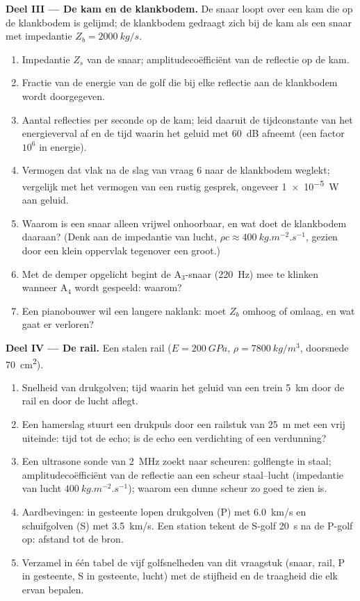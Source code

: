 \begin{problem}
\medskip
\noindent\textbf{Deel III --- De kam en de klankbodem.}
De snaar loopt over een kam die op de klankbodem is gelijmd; de klankbodem
gedraagt zich bij de kam als een snaar met impedantie
$Z_b = \qty{2000}{kg/s}$.
\begin{enumerate}[resume]
  \item Impedantie $Z_s$ van de snaar; amplitudecoëfficiënt van de reflectie
        op de kam.
  \item Fractie van de energie van de golf die bij elke reflectie aan de
        klankbodem wordt doorgegeven.
  \item Aantal reflecties per seconde op de kam; leid daaruit de
        tijdconstante van het energieverval af en de tijd waarin het geluid
        met \qty{60}{dB} afneemt (een factor $10^6$ in energie).
  \item Vermogen dat vlak na de slag van vraag 6 naar de klankbodem weglekt;
        vergelijk met het vermogen van een rustig gesprek, ongeveer
        \qty{1e-5}{W} aan geluid.
  \item Waarom is een snaar alleen vrijwel onhoorbaar, en wat doet de
        klankbodem daaraan? (Denk aan de impedantie van lucht,
        $\rho c \approx \qty{400}{kg.m^{-2}.s^{-1}}$, gezien door een klein
        oppervlak tegenover een groot.)
  \item Met de demper opgelicht begint de A$_3$-snaar (\qty{220}{Hz}) mee te
        klinken wanneer A$_4$ wordt gespeeld: waarom?
  \item Een pianobouwer wil een langere naklank: moet $Z_b$ omhoog of
        omlaag, en wat gaat er verloren?
\end{enumerate}

\medskip
\noindent\textbf{Deel IV --- De rail.}
Een stalen rail ($E = \qty{200}{GPa}$, $\rho = \qty{7800}{kg/m^3}$,
doorsnede \qty{70}{cm^2}).
\begin{enumerate}[resume]
  \item Snelheid van drukgolven; tijd waarin het geluid van een trein
        \qty{5}{km} door de rail en door de lucht aflegt.
  \item Een hamerslag stuurt een drukpuls door een railstuk van \qty{25}{m}
        met een vrij uiteinde: tijd tot de echo; is de echo een verdichting
        of een verdunning?
  \item Een ultrasone sonde van \qty{2}{MHz} zoekt naar scheuren: golflengte
        in staal; amplitudecoëfficiënt van de reflectie aan een scheur
        staal--lucht (impedantie van lucht $\qty{400}{kg.m^{-2}.s^{-1}}$);
        waarom een dunne scheur zo goed te zien is.
  \item Aardbevingen: in gesteente lopen drukgolven (P) met \qty{6.0}{km/s}
        en schuifgolven (S) met \qty{3.5}{km/s}. Een station tekent de
        S-golf \qty{20}{s} na de P-golf op: afstand tot de bron.
  \item Verzamel in één tabel de vijf golfsnelheden van dit vraagstuk
        (snaar, rail, P in gesteente, S in gesteente, lucht) met de
        stijfheid en de traagheid die elk ervan bepalen.
\end{enumerate}
\end{problem}
